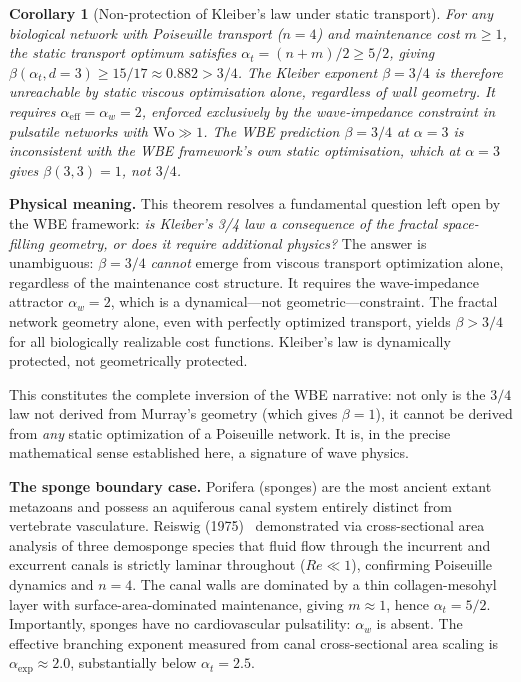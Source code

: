 \documentclass[11pt,a4paper]{article}
\newtheorem{corollary}[theorem]{Corollary}
\theoremstyle{remark}
\begin{document}
\begin{corollary}[Non-protection of Kleiber's law under static transport]
For any biological network with Poiseuille transport ($n=4$) and
maintenance cost $m \ge 1$, the static transport optimum satisfies
$\alpha_t = (n+m)/2 \ge 5/2$, giving
$\beta(\alpha_t, d=3) \ge 15/17 \approx 0.882 > 3/4$. The Kleiber
exponent $\beta = 3/4$ is therefore unreachable by static viscous
optimisation alone, regardless of wall geometry. It requires
$\alpha_{\mathrm{eff}} = \alpha_w = 2$, enforced exclusively by the
wave-impedance constraint in pulsatile networks with $\mathrm{Wo} \gg 1$.
The WBE prediction $\beta = 3/4$ at $\alpha = 3$ is inconsistent with
the WBE framework's own static optimisation, which at $\alpha = 3$
gives $\beta(3,3) = 1$, not $3/4$.
\end{corollary}

\vspace{0.4em}
\noindent\textbf{Physical meaning.} This theorem resolves a fundamental question left open by the WBE framework: \textit{is Kleiber's 3/4 law a consequence of the fractal space-filling geometry, or does it require additional physics?} The answer is unambiguous: $\beta = 3/4$ \textit{cannot} emerge from viscous transport optimization alone, regardless of the maintenance cost structure. It requires the wave-impedance attractor $\alpha_w = 2$, which is a dynamical---not geometric---constraint. The fractal network geometry alone, even with perfectly optimized transport, yields $\beta > 3/4$ for all biologically realizable cost functions. Kleiber's law is dynamically protected, not geometrically protected.

This constitutes the complete inversion of the WBE narrative: not only is the
$3/4$ law not derived from Murray's geometry (which gives $\beta=1$), it cannot
be derived from \textit{any} static optimization of a Poiseuille network. It is,
in the precise mathematical sense established here, a signature of wave physics.

\noindent \textbf{The sponge boundary case.} Porifera (sponges) are the most ancient extant metazoans and possess an aquiferous canal system entirely distinct from vertebrate vasculature. Reiswig (1975)~\cite{reiswig1975} demonstrated via cross-sectional area analysis of three demosponge species that fluid flow through the incurrent and excurrent canals is strictly laminar throughout ($Re \ll 1$), confirming Poiseuille dynamics and $n=4$. The canal walls are dominated by a thin collagen-mesohyl layer with surface-area-dominated maintenance, giving $m \approx 1$, hence $\alpha_t = 5/2$. Importantly, sponges have no cardiovascular pulsatility: $\alpha_w$ is absent. The effective branching exponent measured from canal cross-sectional area scaling is $\alpha_{\exp} \approx 2.0$, substantially below $\alpha_t = 2.5$.
\end{document}
